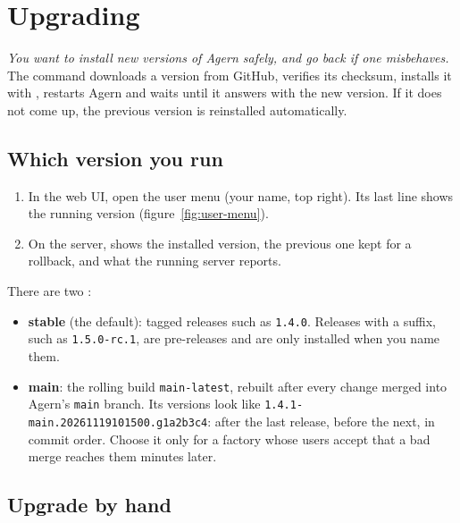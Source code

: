 \chapter{Upgrading}\label{ch:upgrade}

\emph{You want to install new versions of Agern safely, and go back if one misbehaves.} The
 command downloads a version from GitHub, verifies its checksum, installs it with
, restarts Agern and waits until it answers with the new version. If it does not come
up, the previous version is reinstalled automatically.

\section{Which version you run}\label{sec:version}

\begin{enumerate}
  \item In the web UI, open the user menu (your name, top right). Its last line shows the running
    version (figure~\ref{fig:user-menu}).
  \item On the server,  shows the installed version, the previous one kept for a
    rollback, and what the running server reports.
\end{enumerate}


There are two :

\begin{itemize}
  \item \textbf{stable} (the default): tagged releases such as \texttt{1.4.0}. Releases with a suffix,
    such as \texttt{1.5.0-rc.1}, are pre-releases and are only installed when you name them.
  \item \textbf{main}: the rolling build \texttt{main-latest}, rebuilt after every change merged into
    Agern's \texttt{main} branch. Its versions look like \texttt{1.4.1-main.20261119101500.g1a2b3c4}:
    after the last release, before the next, in commit order. Choose it only for a factory whose
    users accept that a bad merge reaches them minutes later.
\end{itemize}

\section{Upgrade by hand}\label{sec:upgrade}

